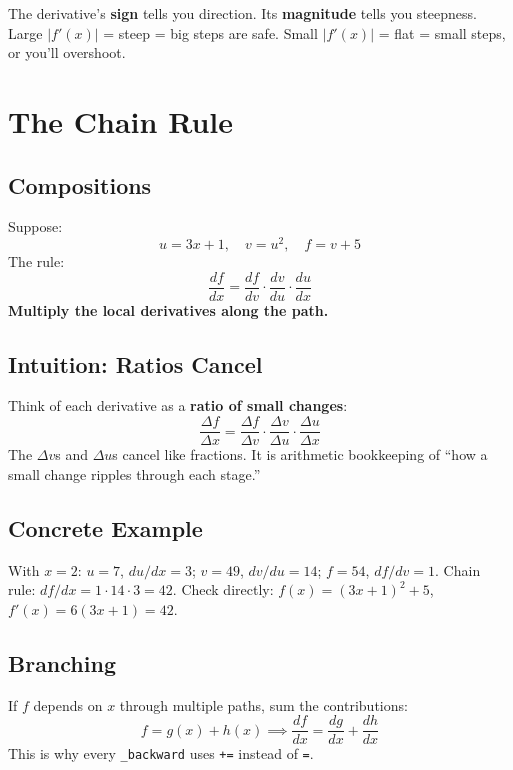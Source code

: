 \documentclass[11pt,a4paper]{book}
\begin{document}
The derivative's \textbf{sign} tells you direction. Its \textbf{magnitude} tells you steepness.
Large $|f'(x)|$ = steep = big steps are safe. Small $|f'(x)|$ = flat = small steps, or you'll overshoot.

\chapter{The Chain Rule}\label{ch:chainrule}

\section{Compositions}

Suppose:
\begin{equation}
    u = 3x + 1, \quad v = u^2, \quad f = v + 5
\end{equation}
The rule:
\begin{equation}\label{eq:chainrule}
    \frac{df}{dx} = \frac{df}{dv} \cdot \frac{dv}{du} \cdot \frac{du}{dx}
\end{equation}
\textbf{Multiply the local derivatives along the path.}

\section{Intuition: Ratios Cancel}

Think of each derivative as a \textbf{ratio of small changes}:
\begin{equation}
    \frac{\Delta f}{\Delta x} = \frac{\Delta f}{\Delta v} \cdot \frac{\Delta v}{\Delta u} \cdot \frac{\Delta u}{\Delta x}
\end{equation}
The $\Delta v$s and $\Delta u$s cancel like fractions. It is arithmetic bookkeeping of ``how a small change ripples through each stage.''

\section{Concrete Example}

With $x = 2$: $u=7$, $du/dx=3$; $v=49$, $dv/du=14$; $f=54$, $df/dv=1$.
Chain rule: $df/dx = 1 \cdot 14 \cdot 3 = 42$.
Check directly: $f(x) = (3x+1)^2+5$, $f'(x) = 6(3x+1) = 42$. \checkmark

\section{Branching}

If $f$ depends on $x$ through multiple paths, sum the contributions:
\begin{equation}
    f = g(x) + h(x) \implies \frac{df}{dx} = \frac{dg}{dx} + \frac{dh}{dx}
\end{equation}
This is why every \texttt{\_backward} uses \texttt{+=} instead of \texttt{=}.
\end{document}
